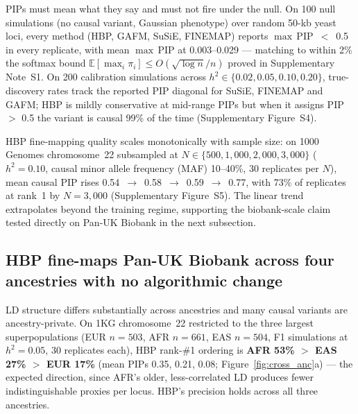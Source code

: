 PIPs must mean what they say and must not fire under the null. On
100 null simulations (no causal variant, Gaussian phenotype) over
random 50-kb yeast loci, every method (HBP, GAFM, SuSiE, FINEMAP)
reports $\max$\,PIP~$<$~0.5 in every replicate, with mean
$\max$\,PIP at 0.003--0.029 --- matching to within 2\% the
softmax bound $\mathbb{E}[\max_i \pi_i] \leq
O(\sqrt{\log n}/n)$ proved in Supplementary Note~S1. On 200
calibration simulations across $h^2 \in \{0.02, 0.05, 0.10, 0.20\}$,
true-discovery rates track the reported PIP diagonal for SuSiE,
FINEMAP and GAFM; HBP is mildly conservative at mid-range PIPs but
when it assigns PIP $>$ 0.5 the variant is causal 99\% of the
time (Supplementary Figure~S4).

HBP fine-mapping quality scales monotonically with sample size:
on 1000 Genomes chromosome~22 subsampled at
$N \in \{500, 1{,}000, 2{,}000, 3{,}000\}$ ($h^2 = 0.10$, causal
minor allele frequency (MAF) 10--40\%, 30 replicates per $N$),
mean causal PIP rises
0.54~$\rightarrow$~0.58~$\rightarrow$~0.59~$\rightarrow$~0.77, with
73\% of replicates at rank~1 by $N = 3{,}000$ (Supplementary
Figure~S5). The linear trend extrapolates beyond the training
regime, supporting the biobank-scale claim tested directly on
Pan-UK Biobank in the next subsection.

\subsection*{HBP fine-maps Pan-UK Biobank across four ancestries with no algorithmic change}\label{sec:cross_anc}

LD structure differs substantially across ancestries and many causal
variants are ancestry-private. On 1KG chromosome~22 restricted to
the three largest superpopulations (EUR $n=503$, AFR $n=661$, EAS
$n=504$, F1 simulations at $h^2 = 0.05$, 30 replicates each), HBP
rank-\#1 ordering is \textbf{AFR 53\% $>$ EAS 27\% $>$ EUR 17\%}
(mean PIPs 0.35, 0.21, 0.08; Figure~\ref{fig:cross_anc}a) --- the
expected direction, since AFR's older, less-correlated LD produces
fewer indistinguishable proxies per locus. HBP's precision holds
across all three ancestries.

